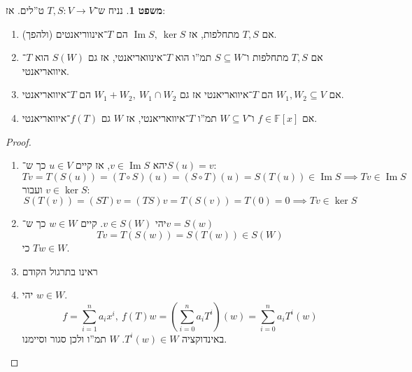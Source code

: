 \documentclass[a4paper]{article}
\DeclareMathOperator\Img   {Im}
\newcommand\F         {\mathbb{F}}
\newcommand\co        {\colon}
\newcommand\cl [1]    {\left ( #1 \right )}
\theoremstyle{definition}
\newtheorem{Theorem}{\color{myblue}משפט}
\newcommand\theo  [1] {\begin{Theorem}#1\end{Theorem}}
\begin{document}
	\theo{נניח ש־$T, S \co V \to V$ ט''לים. אז: 
		\begin{enumerate}
			\item אם $T, S$ מתחלפות, אז $\Img S, \ \ker S$ הם $T$־אינווריאנטים (ולהפך). 
			\item אם $T, S$ מתחלפות ו־$S \subseteq W$ תמ''ו הוא $T$־אינוואריאנטי, אז גם $S(W)$ הוא $T$־איוואריאנטי. 
			\item אם $W_1, W_2 \subseteq V$ הם $T$־איוואריאנטי אז גם $W_1 + W_2, \ W_1 \cap W_2$ הם $T$־איוואריאנטי. 
			\item אם $f \in \F[x]$ ו־$W \subseteq V$ תמ''ו $T$־איוואריאנטי, אז $W$ גם $f(T)$־איוואריאנטי. 
	\end{enumerate}}
	\begin{proof}\,
		\begin{enumerate}
			\item יהא $v \in \Img S$, אז קיים $u \in V$ כך ש־$S(u) = v$: 
			\[ Tv = T(S(u)) = (T \circ S)(u) = (S \circ T)(u) = S(T(u)) \in \Img S \implies Tv \in \Img S \]
			ועבור $v \in \ker S$: 
			\[ S(T(v)) = (ST)v = (TS)v = T(S(v)) = T(0) = 0 \implies Tv \in \ker S \]
			\item יהי $v \in S(W)$. קיים $w \in W$ כך ש־$v = S(w)$
			\[ Tv = T(S(w)) = S(T(w)) \in S(W) \]
			כי $Tw \in W$. 
			\item ראינו בתרגול הקודם
			\item יהי $w \in W$. 
			\[ f = \sum_{i = 1}^{n}a_ix^{i}, \ f(T)w = \cl{\sum_{i = 0}^{n}a_iT^{i}}(w) = \sum_{i = 0}^{n}a_iT^{i}(w) \]
			באינדוקציה $T^{i}(w) \in W$. $W$ תמ''ו ולכן סגור וסיימנו. 
		\end{enumerate}
	\end{proof}
	
\end{document}
